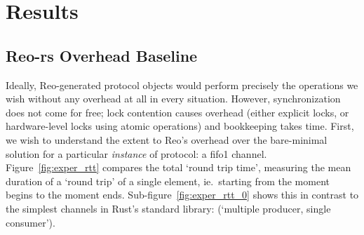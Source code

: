 \section{Results}

\subsection{Reo-rs Overhead Baseline}
Ideally, Reo-generated protocol objects would perform precisely the operations we wish without any overhead at all in every situation. However, synchronization does not come for free; lock contention causes overhead (either explicit locks, or hardware-level locks using atomic operations) and bookkeeping takes time. First, we wish to understand the extent to Reo's overhead over the bare-minimal solution for a particular \textit{instance} of protocol: a fifo1 channel. Figure~\ref{fig:exper_rtt} compares the total `round trip time', measuring the mean duration of a `round trip' of a single element, ie.\ starting from the moment  begins to the moment  ends. Sub-figure~\ref{fig:exper_rtt_0} shows this in contrast to the simplest channels in Rust's standard library:  (`multiple producer, single consumer').


